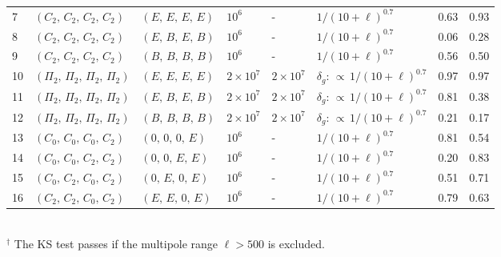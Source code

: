 \documentclass[%
 reprint,
superscriptaddress,
nofootinbib,
 amsmath,amssymb,
 aps,
 prd,
]{revtex4-2}
\begin{document}
\begin{table}[t]
\begin{tabular}{@{} l l l l l l p{} p{}@{}}
    \midrule

    7 &
    $(C_2,\,C_2,\, C_2,\, C_2)$
    & $(E,\, E,\, E,\, E)$
    & $10^6$
    & -
    & $1/(10+\ell)^{0.7}$
    & 0.63 & 0.93 \\

    8 &
    $(C_2,\,C_2,\, C_2,\, C_2)$
    & $(E,\, B,\, E,\, B)$
    & $10^6$
    & -
    & $1/(10+\ell)^{0.7}$
    & 0.06 & 0.28 \\

    9 &
    $(C_2,\,C_2,\, C_2,\, C_2)$
    & $(B,\, B,\, B,\, B)$
    & $10^6$
    & -
    & $1/(10+\ell)^{0.7}$
    & 0.56 & 0.50 \\

    10 &
    $(\Pi_2,\,\Pi_2,\, \Pi_2,\, \Pi_2)$
    & $(E,\, E,\, E,\, E)$
    & $2\times 10^7$
    & $2\times 10^7$
    & $\delta_g$: $\propto\, 1/(10+\ell)^{0.7}$
    & 0.97 &  0.97 \\

    11 &
    $(\Pi_2,\,\Pi_2,\, \Pi_2,\, \Pi_2)$
    & $(E,\, B,\, E,\, B)$
    & $2\times10^7$
    & $2\times 10^7$
    & $\delta_g$: $\propto\, 1/(10+\ell)^{0.7}$
    & 0.81 & 0.38\\

    12 &
    $(\Pi_2,\,\Pi_2,\, \Pi_2,\, \Pi_2)$
    & $(B,\, B,\, B,\, B)$
    & $2\times 10^7$
    & $2\times 10^7$
    & $\delta_g$: $\propto\, 1/(10+\ell)^{0.7}$
    & 0.21 & 0.17\\

    \midrule

    13 &
    $(C_0,\,C_0,\, C_0,\, C_2)$
    & $(0,\, 0,\, 0,\, E)$
    & $10^6$
    & -
    & $1/(10+\ell)^{0.7}$
    & 0.81 & 0.54  \\

    14 &
    $(C_0,\,C_0,\, C_2,\, C_2)$
    & $(0,\, 0,\, E,\, E)$
    & $10^6$
    & -
    & $1/(10+\ell)^{0.7}$
    & 0.20 & 0.83 \\

    15 &
    $(C_0,\,C_2,\, C_0,\, C_2)$
    & $(0,\, E,\, 0,\, E)$
    & $10^6$
    & -
    & $1/(10+\ell)^{0.7}$
    & 0.51 & 0.71 \\

    16 &
    $(C_2,\,C_2,\, C_0,\, C_2)$
    & $(E,\, E,\, 0,\, E)$
    & $10^6$
    & -
    & $1/(10+\ell)^{0.7}$
    & 0.79 & 0.63 \\

    \bottomrule
    \end{tabular} \label{tab:validation} \\
    \footnotesize{$^\dagger$ The KS test passes if the multipole range $\ell>500$ is excluded.}
    \end{table}
\end{document}
